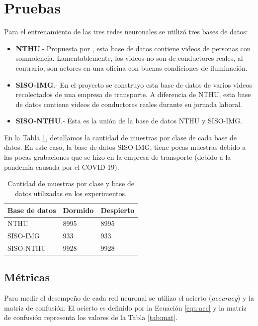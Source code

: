 \documentclass{article}
\begin{document}
	\section{Pruebas}
	
	Para el entrenamiento de las tres redes neuronales se utilizó tres bases de datos:
	
	\begin{itemize}
		\item \textbf{NTHU}.- Propuesta por \cite{weng2016driver}, esta base de datos contiene videos de personas con somnolencia. Lamentablemente, los videos no son de conductores reales, al contrario, son actores en una oficina con buenas condiciones de iluminación.
		\item \textbf{SISO-IMG}.- En el proyecto se construyo esta base de datos de varios videos recolectados de una empresa de transporte. A diferencia de NTHU, esta base de datos contiene videos de conductores reales durante su jornada laboral.
		\item \textbf{SISO-NTHU}.- Esta es la unión de la base de datos NTHU y SISO-IMG.		
	\end{itemize}

	En la Tabla \ref{tab:bds}, detallamos la cantidad de muestras por clase de cada base de datos. En este caso, la base de datos SISO-IMG, tiene pocas muestras debido a las pocas grabaciones que se hizo en la empresa de transporte (debido a la pandemia causada por el COVID-19).
	
	\begin{table}[H]
		\centering		
		\caption{Cantidad de muestras por clase y base de datos utilizadas en los experimentos.}
		\label{tab:bds}
		\begin{tabular}{ p{3cm} p{3cm} p{3cm}}
			\hline 
			\textbf{Base de datos} & \textbf{Dormido} & \textbf{Despierto}   \\
			\hline 
			NTHU & 8995 & 8995 \\
			SISO-IMG & 933 & 933 \\			
			SISO-NTHU & 9928 & 9928 \\
			\hline 
		\end{tabular}
	\end{table}

	\subsection{Métricas}
	Para medir el desempeño de cada red neuronal se utilizo el acierto (\textit{accuracy}) y la matriz de confusión. El acierto es definido por la Ecuación \ref{equ:acc} y la matriz de confusión representa los valores de la Tabla \ref{tab:mat}. 
	
\end{document}
